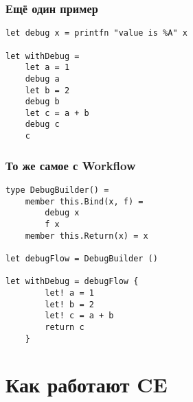 \documentclass{../../slides-style}
\begin{document}
    \begin{frame}[fragile]
        \frametitle{Ещё один пример}
        \begin{verbatim}
let debug x = printfn "value is %A" x

let withDebug = 
    let a = 1
    debug a
    let b = 2
    debug b
    let c = a + b
    debug c
    c
        \end{verbatim}
    \end{frame}

    \begin{frame}[fragile]
        \frametitle{То же самое с Workflow}
        \begin{verbatim}
type DebugBuilder() =
    member this.Bind(x, f) = 
        debug x 
        f x
    member this.Return(x) = x

let debugFlow = DebugBuilder ()

let withDebug = debugFlow {
        let! a = 1
        let! b = 2
        let! c = a + b
        return c
    }
        \end{verbatim}
    \end{frame}

    \section{Как работают CE}
\end{document}
